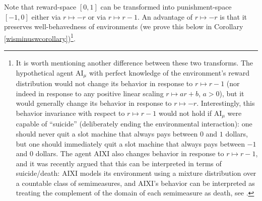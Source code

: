 \documentclass[runningheads]{llncs}
\begin{document}
Note that reward-space $[0,1]$ can be transformed into punishment-space
$[-1,0]$ either via $r\mapsto -r$ or via $r\mapsto r-1$.
An advantage of $r\mapsto -r$ is that it preserves well-behavedness of
environments (we prove this below in
Corollary \ref{wisminuswcorollary})\footnote{It
is worth mentioning another difference
between these two transforms. The hypothetical agent
$\mathrm{AI}_\mu$ with perfect knowledge of the environment's reward distribution
would not change its behavior in response to $r\mapsto r-1$ (nor indeed
in response to any positive linear scaling $r\mapsto ar+b$, $a>0$), but it would
generally change its behavior in response to $r\mapsto -r$. Interestingly, this
behavior invariance
with respect to $r\mapsto r-1$ would not hold if $\mathrm{AI}_\mu$ were capable of
``suicide'' (deliberately ending the environmental interaction):
one should never quit a slot machine that always pays between $0$ and $1$
dollars, but one should immediately quit a slot machine that always pays
between $-1$ and $0$ dollars.
The agent
AIXI also changes behavior in response to $r\mapsto r-1$, and it was recently argued
that
this can be interpreted in terms of suicide/death: AIXI models its environment using a mixture
distribution over a countable class of semimeasures, and AIXI's behavior can be interpreted
as treating the complement of the domain of each semimeasure as death,
see \cite{martin2016death}.}.


\end{document}

